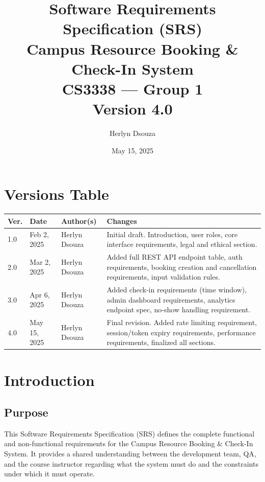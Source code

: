 \documentclass[12pt]{article}
\title{
    \vspace{2cm}
    {\Large Software Requirements Specification (SRS)} \\[1em]
    {\LARGE \textbf{Campus Resource Booking \& Check-In System}} \\[2em]
    {\large CS3338 --- Group 1} \\[0.5em]
    {\normalsize Version 4.0}
    \vspace{2cm}
}
\author{Herlyn Dsouza}
\date{May 15, 2025}
\begin{document}
\maketitle
\thispagestyle{empty}
\newpage

\tableofcontents
\newpage

\section*{Versions Table}

\begin{longtable}{|p{1.4cm}|p{2.4cm}|p{3.5cm}|p{6.5cm}|}
\hline
\textbf{Ver.} & \textbf{Date} & \textbf{Author(s)} & \textbf{Changes} \\
\hline
1.0 & Feb 2, 2025  & Herlyn Dsouza & Initial draft. Introduction, user roles, core interface requirements, legal and ethical section. \\
\hline
2.0 & Mar 2, 2025  & Herlyn Dsouza & Added full REST API endpoint table, auth requirements, booking creation and cancellation requirements, input validation rules. \\
\hline
3.0 & Apr 6, 2025  & Herlyn Dsouza & Added check-in requirements (time window), admin dashboard requirements, analytics endpoint spec, no-show handling requirement. \\
\hline
4.0 & May 15, 2025 & Herlyn Dsouza & Final revision. Added rate limiting requirement, session/token expiry requirements, performance requirements, finalized all sections. \\
\hline
\end{longtable}
\newpage

\section{Introduction}

\subsection{Purpose}
This Software Requirements Specification (SRS) defines the complete functional and non-functional requirements for the Campus Resource Booking \& Check-In System. It provides a shared understanding between the development team, QA, and the course instructor regarding what the system must do and the constraints under which it must operate.
\end{document}
